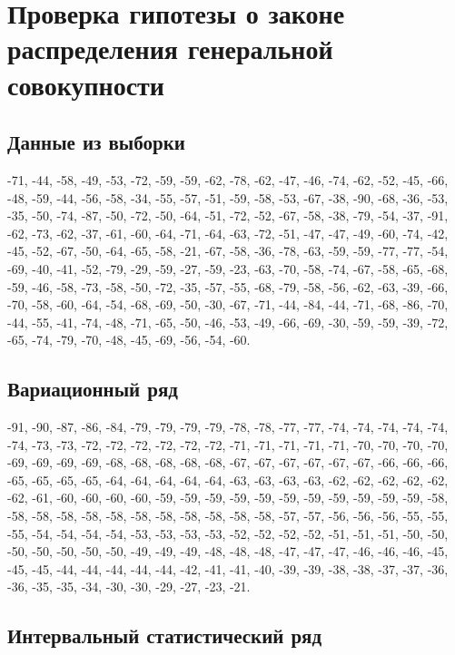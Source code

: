 \section*{Проверка гипотезы о законе распределения генеральной совокупности}

\subsection*{Данные из выборки}

-71, -44, -58, -49, -53, -72, -59, -59, -62, -78, -62, -47, -46, -74, -62, -52, -45, -66,
-48, -59, -44, -56, -58, -34, -55, -57, -51, -59, -58, -53, -67, -38, -90, -68, -36, -53,
-35, -50, -74, -87, -50, -72, -50, -64, -51, -72, -52, -67, -58, -38, -79, -54, -37, -91,
-62, -73, -62, -37, -61, -60, -64, -71, -64, -63, -72, -51, -47, -47, -49, -60, -74, -42,
-45, -52, -67, -50, -64, -65, -58, -21, -67, -58, -36, -78, -63, -59, -59, -77, -77, -54,
-69, -40, -41, -52, -79, -29, -59, -27, -59, -23, -63, -70, -58, -74, -67, -58, -65, -68,
-59, -46, -58, -73, -58, -50, -72, -35, -57, -55, -68, -79, -58, -56, -62, -63, -39, -66,
-70, -58, -60, -64, -54, -68, -69, -50, -30, -67, -71, -44, -84, -44, -71, -68, -86, -70,
-44, -55, -41, -74, -48, -71, -65, -50, -46, -53, -49, -66, -69, -30, -59, -59, -39, -72,
-65, -74, -79, -70, -48, -45, -69, -56, -54, -60.

\subsection*{Вариационный ряд}

-91, -90, -87, -86, -84, -79, -79, -79, -79, -78, -78, -77, -77, -74, -74, -74, -74, -74,
-74, -73, -73, -72, -72, -72, -72, -72, -72, -71, -71, -71, -71, -71, -70, -70, -70, -70,
-69, -69, -69, -69, -68, -68, -68, -68, -68, -67, -67, -67, -67, -67, -67, -66, -66, -66,
-65, -65, -65, -65, -64, -64, -64, -64, -64, -63, -63, -63, -63, -62, -62, -62, -62, -62,
-62, -61, -60, -60, -60, -60, -59, -59, -59, -59, -59, -59, -59, -59, -59, -59, -59, -58,
-58, -58, -58, -58, -58, -58, -58, -58, -58, -58, -58, -57, -57, -56, -56, -56, -55, -55,
-55, -54, -54, -54, -54, -53, -53, -53, -53, -52, -52, -52, -52, -51, -51, -51, -50, -50,
-50, -50, -50, -50, -50, -49, -49, -49, -48, -48, -48, -47, -47, -47, -46, -46, -46, -45,
-45, -45, -44, -44, -44, -44, -44, -42, -41, -41, -40, -39, -39, -38, -38, -37, -37, -36,
-36, -35, -35, -34, -30, -30, -29, -27, -23, -21.

\subsection*{Интервальный статистический ряд}

